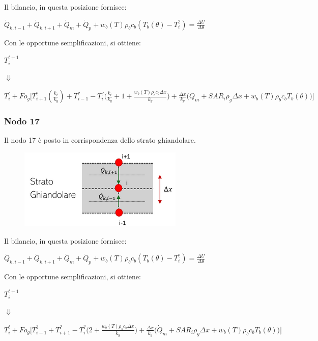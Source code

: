 Il bilancio, in questa posizione fornisce:
\begin{center}
	$ \Dot{Q} _{k, i-1} +\Dot{Q} _{k, i+1}+ \Dot{Q} _{m} +\Dot{Q} _{p}+ w_b (T) \rho _b c_b (T_b(\theta)-T_i ^?)= \frac{\Delta U}{\Delta \theta} $
\end{center}
Con le opportune semplificazioni, si ottiene:
\begin{center}
	$T_i ^{t+1} $
\end{center}
\begin{center}
	$\Downarrow$
\end{center}
\begin{center}
	$T_i ^t + Fo_{g} \Bigg[ T_{i+1} ^? (\frac{k_{t}}{k_g}) + T_{i-1} ^?- T_i ^? \Big(\frac{k_{t}}{k_g} + 1 + \frac{ w_b (T) \rho _b c_b \Delta x }{k_{g}} \Big) + \frac{\Delta x }{k_{g}} \Big(\Dot{Q} _{m} +  SAR_i \rho _{g} \Delta x + w_b (T) \rho _b c_b T_b(\theta)\Big) \Bigg]$
\end{center}

\subsubsection*{Nodo 17}
Il nodo 17 è posto in corrispondenza dello strato ghiandolare.\\
\begin{figure}[H]
    \centering
    \includegraphics[width=.6\textwidth]{Immagini/Nodi/nodo17.png} 
    \label{nodo17}
\end{figure}
\noindent
Il bilancio, in questa posizione fornisce:
\begin{center}
	$ \Dot{Q} _{k, i-1} +\Dot{Q} _{k, i+1}+ \Dot{Q} _{m} +\Dot{Q} _{p}+ w_b (T) \rho _b c_b (T_b(\theta)-T_i ^?)= \frac{\Delta U}{\Delta \theta} $
\end{center}
Con le opportune semplificazioni, si ottiene:
\begin{center}
	$T_i ^{t+1} $
\end{center}
\begin{center}
	$\Downarrow$
\end{center}
\begin{center}
	$T_i ^t + Fo_{g} \Bigg[ T_{i-1} ^? + T_{i+1} ^?- T_i ^? \Big(2 + \frac{ w_b (T) \rho _b c_b \Delta x }{k_{g}} \Big) + \frac{\Delta x }{k_{g}} \Big(\Dot{Q} _{m} +  SAR_i \rho _{g} \Delta x + w_b (T) \rho _b c_b T_b(\theta)\Big) \Bigg]$
\end{center}

